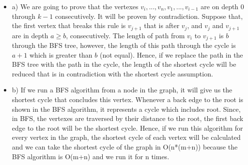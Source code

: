 \documentclass[12pt]{article}
\newenvironment{solution}[2][Solution]{\begin{trivlist}
\item[\hskip \labelsep {\bfseries #1}]}{\end{trivlist}}
\begin{document}
\begin{solution}{}
\begin{itemize}
\item a) We are going to prove that the vertexes $v_i, ..., v_n, v_1, ..., v_{i-1}$ are on depth
$0$ through $k-1$ consecutively. It will be proven by contradiction. Suppose that, the first
vertex that breaks this rule is $v_{j+1}$ that is after $v_j$, and $v_j$ and $v_{j+1}$ are in 
depth $a \geq b$, consecutively. The length of path from $v_i$ to $v_{j+1}$ is $b$ through
the BFS tree, however, the length of this path through the cycle is $a+1$ which is greater
than $b$ (not equal). Hence, if we replace the path in the BFS tree with the path in the cycle,
the length of the shortest cycle will be reduced that is in contradiction with the shortest cycle
assumption.

\item b) If we run a BFS algorithm from a node in the graph, it will give us the shortest cycle
that concludes this vertex. Whenever a back edge to the root is shown in the BFS algorithm,
it represents a cycle which includes root. Since, in BFS, the vertexes are traversed by their
distance to the root, the first back edge to the root will be the shortest cycle. Hence, if we run
this algorithm for every vertex in the graph, the shortest cycle of each vertex will be calculated
and we can take the shortest cycle of the graph in O(n*(m+n)) because the BFS algorithm is O(m+n)
and we run it for n times. 

\end{itemize}
\end{solution}



\pagebreak
\end{document}
